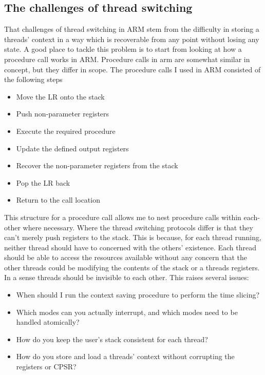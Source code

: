 \subsection{The challenges of thread switching}
That challenges of thread switching in ARM stem from the difficulty in storing a threads' context in a way which is recoverable from any point without losing any state. A good place to tackle this problem is to start from looking at how a procedure call works in ARM. Procedure calls in arm are somewhat similar in concept, but they differ in scope. The procedure calls \cite{arm_man} I used in ARM consisted of the following steps
\begin{itemize}
	\item Move the LR onto the stack 
	\item Push non-parameter registers
	\item Execute the required procedure
	\item Update the defined output registers
	\item Recover the non-parameter registers from the stack
	\item Pop the LR back
	\item Return to the call location
\end{itemize} %
This structure for a procedure call allows me to nest procedure calls within each-other where necessary. Where the thread switching protocols differ is that they can't merely push registers to the stack. This is because, for each thread running, neither thread should have to concerned with the others' existence. Each thread should be able to access the resources available without any concern that the other threads could be modifying the contents of the stack or a threads registers. In a sense threads should be invisible to each other. This raises several issues:
\begin{itemize}
	\item When should I run the context saving procedure to perform the time slicing?
	\item Which modes can you actually interrupt, and which modes need to be handled atomically?
	\item How do you keep the user's stack consistent for each thread?
	\item How do you store and load a threads' context without corrupting the registers or CPSR?
\end{itemize}
